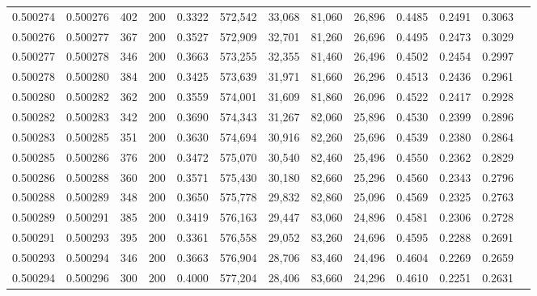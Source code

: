 \begin{tabular}{rrrrrrrrrrrrr}
0.500274 & 0.500276 &    402 & 200 &                                     0.3322 & 572,542 &  33,068 &  81,060 &  26,896 & 0.4485 & 0.2491 & 0.3063 \\
0.500276 & 0.500277 &    367 & 200 &                                     0.3527 & 572,909 &  32,701 &  81,260 &  26,696 & 0.4495 & 0.2473 & 0.3029 \\
0.500277 & 0.500278 &    346 & 200 &                                     0.3663 & 573,255 &  32,355 &  81,460 &  26,496 & 0.4502 & 0.2454 & 0.2997 \\
0.500278 & 0.500280 &    384 & 200 &                                     0.3425 & 573,639 &  31,971 &  81,660 &  26,296 & 0.4513 & 0.2436 & 0.2961 \\
0.500280 & 0.500282 &    362 & 200 &                                     0.3559 & 574,001 &  31,609 &  81,860 &  26,096 & 0.4522 & 0.2417 & 0.2928 \\
0.500282 & 0.500283 &    342 & 200 &                                     0.3690 & 574,343 &  31,267 &  82,060 &  25,896 & 0.4530 & 0.2399 & 0.2896 \\
0.500283 & 0.500285 &    351 & 200 &                                     0.3630 & 574,694 &  30,916 &  82,260 &  25,696 & 0.4539 & 0.2380 & 0.2864 \\
0.500285 & 0.500286 &    376 & 200 &                                     0.3472 & 575,070 &  30,540 &  82,460 &  25,496 & 0.4550 & 0.2362 & 0.2829 \\
0.500286 & 0.500288 &    360 & 200 &                                     0.3571 & 575,430 &  30,180 &  82,660 &  25,296 & 0.4560 & 0.2343 & 0.2796 \\
0.500288 & 0.500289 &    348 & 200 &                                     0.3650 & 575,778 &  29,832 &  82,860 &  25,096 & 0.4569 & 0.2325 & 0.2763 \\
0.500289 & 0.500291 &    385 & 200 &                                     0.3419 & 576,163 &  29,447 &  83,060 &  24,896 & 0.4581 & 0.2306 & 0.2728 \\
0.500291 & 0.500293 &    395 & 200 &                                     0.3361 & 576,558 &  29,052 &  83,260 &  24,696 & 0.4595 & 0.2288 & 0.2691 \\
0.500293 & 0.500294 &    346 & 200 &                                     0.3663 & 576,904 &  28,706 &  83,460 &  24,496 & 0.4604 & 0.2269 & 0.2659 \\
0.500294 & 0.500296 &    300 & 200 &                                     0.4000 & 577,204 &  28,406 &  83,660 &  24,296 & 0.4610 & 0.2251 & 0.2631 \\

\end{tabular}
